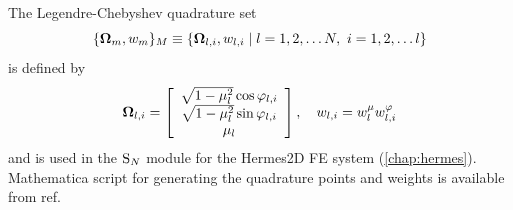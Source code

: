 The Legendre-Chebyshev quadrature set 
$$
	\{\mathbf{\Omega}_m,w_m\}_{M} \equiv \{\mathbf{\Omega}_{l,i},w_{l,i}\mid l = 1,2,\ldots N,\ i = 1,2,\ldots l\}
$$ 
is defined by
\begin{equation}\label{eq:LCNset}
		\mathbf{\Omega}_{l,i} = 
		\left[\begin{array}{c}
		\sqrt{1-\mu_l^2}\cos \varphi_{l,i} \\
		\sqrt{1-\mu_l^2}\sin \varphi_{l,i} \\
		\mu_l
	\end{array}\right],\quad
	w_{l,i} = w_{l}^\mu w_{l,i}^\varphi
\end{equation}
and is used in the $\text{S}_{N}$ module for the Hermes2D FE system (\cref{chap:hermes}). Mathematica script for generating the
quadrature points and weights is available from \alert{ref}.


